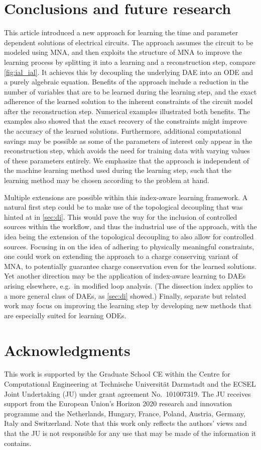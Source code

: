 \documentclass[AMA,STIX1COL]{WileyNJD-v2}
\begin{document}
\section{Conclusions and future research}
\label{sec:cfr}
This article introduced a new approach for learning the time and parameter dependent solutions of electrical circuits. The approach assumes the circuit to be modeled using MNA, and then exploits the structure of MNA to improve the learning process by splitting it into a learning and a reconstruction step, compare \autoref{fig:ial_ial}. It achieves this by decoupling the underlying DAE into an ODE and a purely algebraic equation. Benefits of the approach include a reduction in the number of variables that are to be learned during the learning step, and the exact adherence of the learned solution to the inherent constraints of the circuit model after the reconstruction step. Numerical examples illustrated both benefits. The examples also showed that the exact recovery of the constraints might improve the accuracy of the learned solutions. Furthermore, additional computational savings may be possible as some of the parameters of interest only appear in the reconstruction step, which avoids the need for training data with varying values of these parameters entirely. We emphasize that the approach is independent of the machine learning method used during the learning step, such that the learning method may be chosen according to the problem at hand.

Multiple extensions are possible within this index-aware learning framework. A natural first step could be to make use of the topological decoupling that was hinted at in \autoref{sec:di}. This would pave the way for the inclusion of controlled sources within the workflow, and thus the industrial use of the approach, with the idea being the extension of the topological decoupling to also allow for controlled sources. Focusing in on the idea of adhering to physically meaningful constraints, one could work on extending the approach to a charge conserving variant of MNA, to potentially guarantee charge conservation even for the learned solutions. Yet another direction may be the application of index-aware learning to DAEs arising elsewhere, e.g.~in modified loop analysis. (The dissection index applies to a more general class of DAEs, as \autoref{sec:di} showed.) Finally, separate but related work may focus on improving the learning step by developing new methods that are especially suited for learning ODEs.

\section*{Acknowledgments}
This work is supported by the Graduate School CE within the Centre for Computational Engineering at Technische Universit{\"a}t Darmstadt and the ECSEL Joint Undertaking (JU) under grant agreement No.~101007319. The JU receives support from the European Union's Horizon 2020 research and innovation programme and the Netherlands, Hungary, France, Poland, Austria, Germany, Italy and Switzerland. Note that this work only reflects the authors' views and that the JU is not responsible for any use that may be made of the information it contains.
\end{document}
